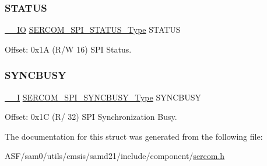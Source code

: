 \subsubsection{\texorpdfstring{STATUS}{STATUS}}
{\footnotesize\ttfamily \mbox{\hyperlink{core__cm0plus_8h_aec43007d9998a0a0e01faede4133d6be}{\+\_\+\+\_\+\+IO}} \mbox{\hyperlink{union_s_e_r_c_o_m___s_p_i___s_t_a_t_u_s___type}{S\+E\+R\+C\+O\+M\+\_\+\+S\+P\+I\+\_\+\+S\+T\+A\+T\+U\+S\+\_\+\+Type}} S\+T\+A\+T\+US}



Offset\+: 0x1A (R/W 16) S\+PI Status. 

\mbox{\label{struct_sercom_spi_a29788de66b216fe3d3699ae808e2abaa}} 
\subsubsection{\texorpdfstring{SYNCBUSY}{SYNCBUSY}}
{\footnotesize\ttfamily \mbox{\hyperlink{core__cm0plus_8h_af63697ed9952cc71e1225efe205f6cd3}{\+\_\+\+\_\+I}} \mbox{\hyperlink{union_s_e_r_c_o_m___s_p_i___s_y_n_c_b_u_s_y___type}{S\+E\+R\+C\+O\+M\+\_\+\+S\+P\+I\+\_\+\+S\+Y\+N\+C\+B\+U\+S\+Y\+\_\+\+Type}} S\+Y\+N\+C\+B\+U\+SY}



Offset\+: 0x1C (R/ 32) S\+PI Synchronization Busy. 



The documentation for this struct was generated from the following file\+:\begin{DoxyCompactItemize}
\item 
A\+S\+F/sam0/utils/cmsis/samd21/include/component/\mbox{\hyperlink{utils_2cmsis_2samd21_2include_2component_2sercom_8h}{sercom.\+h}}\end{DoxyCompactItemize}
